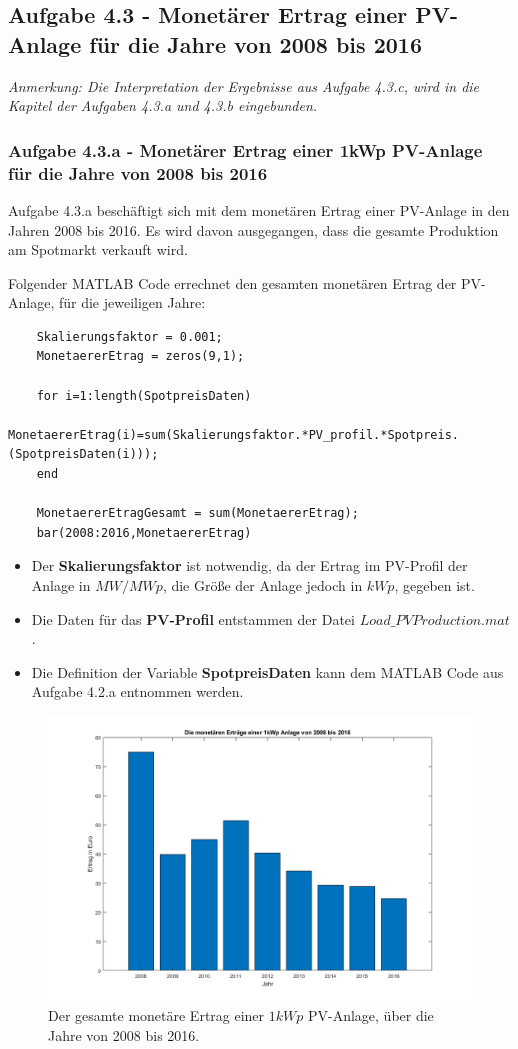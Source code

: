 \documentclass[a4paper,12pt]{article}
\begin{document}
	\subsection{Aufgabe 4.3 - Monetärer Ertrag einer PV-Anlage für die Jahre von 2008 bis 2016}
	\textit{Anmerkung: Die Interpretation der Ergebnisse aus Aufgabe 4.3.c, wird in die Kapitel der Aufgaben 4.3.a und 4.3.b eingebunden.}
	\subsubsection{Aufgabe 4.3.a - Monetärer Ertrag einer 1kWp PV-Anlage für die Jahre von 2008 bis 2016}
	Aufgabe 4.3.a beschäftigt sich mit dem monetären Ertrag einer PV-Anlage in den Jahren 2008 bis 2016. Es wird davon ausgegangen, dass die gesamte Produktion am Spotmarkt verkauft wird.\\ \par
	Folgender MATLAB Code errechnet den gesamten monetären Ertrag der PV-Anlage, für die jeweiligen Jahre:
	\begin{lstlisting}
	Skalierungsfaktor = 0.001;
	MonetaererEtrag = zeros(9,1);
	
	for i=1:length(SpotpreisDaten)
		MonetaererEtrag(i)=sum(Skalierungsfaktor.*PV_profil.*Spotpreis.(SpotpreisDaten(i)));
	end
	
	MonetaererEtragGesamt = sum(MonetaererEtrag);
	bar(2008:2016,MonetaererEtrag)
	\end{lstlisting}
	\begin{itemize}
		\item Der \textbf{Skalierungsfaktor} ist notwendig, da der Ertrag im PV-Profil der Anlage in $MW/MWp$, die Größe der Anlage jedoch in $kWp$, gegeben ist.
		\item Die Daten für das \textbf{PV-Profil} entstammen der Datei $Load\_PVProduction.mat$.
		\item Die Definition der Variable \textbf{SpotpreisDaten} kann dem MATLAB Code aus Aufgabe 4.2.a entnommen werden.
	\end{itemize}
	\begin{figure}[H]
		\centering
		\includegraphics[width=12cm]{img/results/ErtragUeberJahre}
		\caption{Der gesamte monetäre Ertrag einer $1kWp$ PV-Anlage, über die Jahre von 2008 bis 2016.}
	\end{figure}
\end{document}
